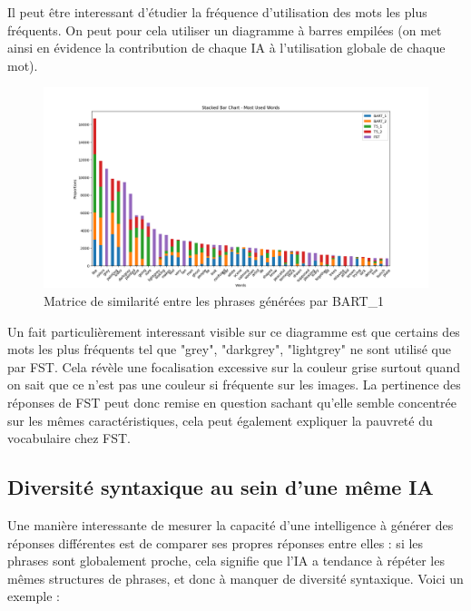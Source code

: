\documentclass[11pt]{article}
\begin{document}
Il peut être interessant d'étudier la fréquence d'utilisation des mots les plus fréquents. On peut pour cela utiliser un diagramme à barres empilées (on met ainsi en évidence la contribution de chaque IA à l'utilisation globale de chaque mot).

\vspace{5mm}

\begin{figure}[H]
\centering
\includegraphics[width=1\textwidth]{../plot/stacked_bars_most_used_words.png}
\caption{Matrice de similarité entre les phrases générées par BART\_1}
\end{figure}

\vspace{5mm}

Un fait particulièrement interessant visible sur ce diagramme est que certains des mots les plus fréquents tel que "grey", "darkgrey", "lightgrey" ne sont utilisé que par FST. Cela révèle une focalisation excessive sur la couleur grise surtout quand on sait que ce n'est pas une couleur si fréquente sur les images. 
La pertinence des réponses de FST peut donc remise en question sachant qu'elle semble concentrée sur les mêmes caractéristiques, cela peut également expliquer la pauvreté du vocabulaire chez FST.

\subsection {Diversité syntaxique au sein d'une même IA}

Une manière interessante de mesurer la capacité d'une intelligence à générer des réponses différentes est de comparer ses propres réponses entre elles : si les phrases sont globalement proche, cela signifie que l'IA a tendance à répéter les mêmes structures de phrases, et donc à manquer de diversité syntaxique.
Voici un exemple : 
\end{document}
